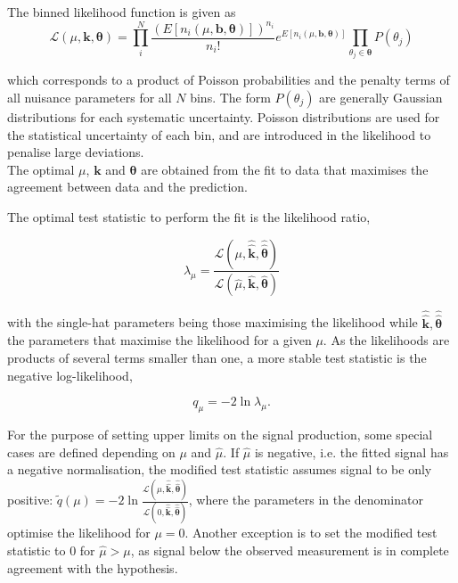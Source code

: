 The binned likelihood function is given as
\begin{equation}
    \mathscr{L}(\mu,\mathbf{k},\boldsymbol{\theta}) = \prod_i^N \frac{ (E[n_i(\mu,\mathbf{b},\boldsymbol{\theta})])^{n_i}}{n_i!}e^{E[n_i(\mu,\mathbf{b},\boldsymbol{\theta})]}\prod_{\theta_j\in\boldsymbol{\theta}}P(\theta_j)
\end{equation}

which corresponds to a product of Poisson probabilities and the penalty terms of all nuisance parameters for all $N$ bins. The form $P(\theta_j)$ are generally Gaussian distributions for each systematic uncertainty. Poisson distributions are used for the statistical uncertainty of each bin, and are introduced in the likelihood to penalise large deviations.\\

The optimal $\mu$, $\mathbf{k}$ and $\boldsymbol{\theta}$ are obtained from the fit to data that maximises the agreement between data and the prediction.

The optimal test statistic to perform the fit is the likelihood ratio, %

\begin{equation}
    \lambda_\mu = \frac{\mathscr{L}(\mu, \hat{\hat{\mathbf{k}}},\hat{\hat{\boldsymbol{\theta}}})}{\mathscr{L}(\hat{\mu}, \hat{\mathbf{k}},\hat{\boldsymbol{\theta}})}
\end{equation}

with the single-hat parameters being those maximising the likelihood while $\hat{\hat{\mathbf{k}}},\hat{\hat{\boldsymbol{\theta}}}$ the parameters that maximise the likelihood for a given $\mu$. As the likelihoods are products of several terms smaller than one, a more stable test statistic is the negative log-likelihood,

\begin{equation}
    q_\mu = -2\ln\lambda_\mu.
\end{equation}

For the purpose of setting upper limits on the signal production, some special cases are defined depending on $\mu$ and $\hat{\mu}$. If $\hat{\mu}$ is negative, i.e. the fitted signal has a negative normalisation, the modified test statistic assumes signal to be only positive: $\tilde{q}(\mu)=-2\ln\frac{\mathscr{L}(\mu, \hat{\hat{\mathbf{k}}},\hat{\hat{\boldsymbol{\theta}}})}{\mathscr{L}(0, \hat{\hat{\mathbf{k}}},\hat{\hat{\boldsymbol{\theta}}})}$, where the parameters in the denominator optimise the likelihood for $\mu=0$. Another exception is to set the modified test statistic to 0 for $\hat{\mu}>\mu$, as signal below the observed measurement is in complete agreement with the hypothesis.\\

